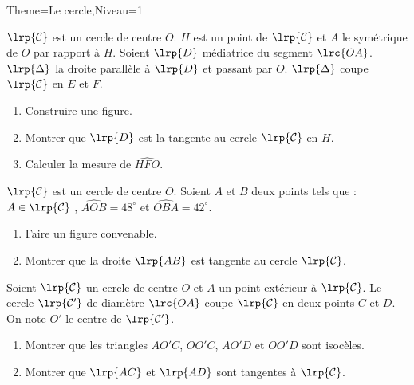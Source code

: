 \documentclass[a4paper,12pt]{article}
\begin{document}
\begin{Maquette}[Fiche]{Theme=Le cercle,Niveau=1}
\begin{exercice}
$\lrp{\mathcal{C}}$ est un cercle de centre $O$. $H$ est un point de $\lrp{\mathcal{C}}$ et $A$ le symétrique de $O$ par rapport à $H$. Soient $\lrp{D}$ médiatrice du segment $\lrc{OA}$. $\lrp{\Delta}$ la droite parallèle à $\lrp{D}$ et passant par $O$. $\lrp{\Delta}$ coupe $\lrp{\mathcal{C}}$ en $E$ et $F$.
\begin{enumerate}
\item Construire une figure.
\item Montrer que $\lrp{D}$ est la tangente au cercle $\lrp{\mathcal{C}}$ en $H$.
\item Calculer la mesure de $\widehat{HFO}$.
\end{enumerate}
\end{exercice}

\begin{exercice}
$\lrp{\mathcal{C}}$ est un cercle de centre $O$. Soient $A$ et $B$ deux points tels que : $A\in \lrp{\mathcal{C}}$ , $\widehat{AOB}=48^{\circ}$ et $\widehat{OBA}=42^{\circ}$.
\begin{enumerate}
\item Faire un figure convenable.
\item Montrer que la droite $\lrp{AB}$ est tangente au cercle $\lrp{\mathcal{C}}$.
\end{enumerate}
\end{exercice}

\begin{exercice}
Soient $\lrp{\mathcal{C}}$ un cercle de centre $O$ et $A$ un point extérieur à $\lrp{\mathcal{C}}$.
Le cercle $\lrp{\mathcal{C'}}$ de diamètre $\lrc{OA}$ coupe $\lrp{\mathcal{C}}$ en deux points $C$ et $D$.
On note $O'$ le centre de $\lrp{\mathcal{C'}}$.
\begin{enumerate}
\item Montrer que les triangles $AO'C$, $OO'C$, $AO'D$ et $OO'D$ sont isocèles.
\item Montrer que $\lrp{AC}$ et $\lrp{AD}$ sont tangentes à $\lrp{\mathcal{C}}$.
\end{enumerate}
\end{exercice}


\end{Maquette}
\end{document}
